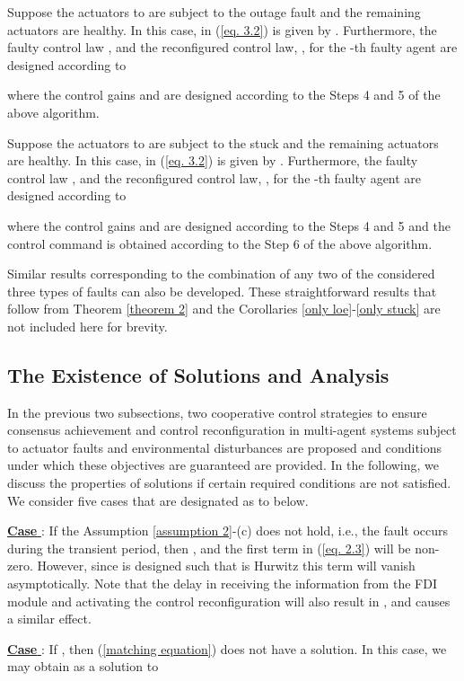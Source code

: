 \documentclass[12pt,draftcls,onecolumn]{IEEEtran}
\newcommand{\RNum}[1]{\uppercase\expandafter{\romannumeral #1\relax}}
\begin{document}
\begin{corollaries}\label{outage}
Suppose the actuators  to  are subject to the outage fault and the remaining actuators are healthy. In this case,  in  (\ref{eq. 3.2}) is given by  . Furthermore,  the faulty control law , and the reconfigured control law, ,  for the -th faulty agent  are designed according to
 
 where the control gains  and  are designed according to the Steps 4 and 5 of the above algorithm. 
\end{corollaries}
\begin{corollaries} \label{only stuck}
Suppose the actuators  to  are subject to the stuck and the remaining actuators are healthy. In this case,  in  (\ref{eq. 3.2}) is given by  . Furthermore,  the faulty control law , and the reconfigured control law, ,  for the -th faulty agent  are designed according to  
 
 where the control gains  and  are designed according to the Steps 4 and 5 and the control command  is obtained according to the Step 6 of the above algorithm. 
\end{corollaries}
Similar results corresponding to the combination of any two of the considered three types of faults can also be developed. These straightforward results that follow from Theorem \ref{theorem 2} and the Corollaries \ref{only loe}-\ref{only stuck} are not included here for brevity.
\subsection{The Existence of Solutions and  Analysis}\label{subsection 3}\par
In the previous two subsections, two cooperative control strategies to ensure consensus achievement and control reconfiguration in  multi-agent systems subject to actuator faults and environmental disturbances are proposed and conditions under which  these objectives are guaranteed are provided. In the following, we discuss the properties of solutions if certain required conditions are not satisfied. We consider five cases that are designated as \RNum{1} to \RNum{4} below. \par
\underline{\textbf{Case \RNum{1}}}: If the Assumption \ref{assumption 2}-(c) does not hold, i.e., the fault occurs during the transient period, then , and  the first term in  (\ref{eq. 2.3}) will be non-zero. However, since  is designed such that  is Hurwitz this term will  vanish asymptotically. Note that the delay in receiving the information from the FDI module and  activating the control reconfiguration  will also result in , and causes a similar effect.  \par
\underline{\textbf{Case \RNum{2}}}: If  , then   (\ref{matching equation}) does not have a solution. In this case, we may obtain  as a solution to
\end{document}

